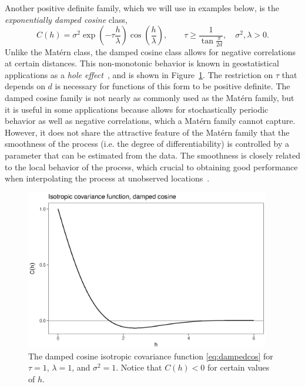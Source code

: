 \documentclass[12pt]{article}
\begin{document}
Another positive definite family, which we will use in examples below, is the \emph{exponentially damped cosine} class, 
\begin{equation} \label{eq:dampedcos}
  C(h) = \sigma^2 \exp \left( -\tau \frac{h}{\lambda} \right) \cos \left( \frac{h}{\lambda} \right), \qquad \tau \geq \frac{1}{\tan \frac{\pi}{2d}}, \quad \sigma^2,\lambda > 0.
\end{equation}
Unlike the Mat\'ern class, the damped cosine class allows for negative correlations at certain distances. This non-monotonic behavior is known in geostatistical applications as a \emph{hole effect}~\cite{Ye2015}, and is shown in Figure~\ref{fig:dampedcos_examples}. The restriction on $\tau$ that depends on $d$ is necessary for functions of this form to be positive definite. %
The damped cosine family is not nearly as commonly used as the Mat\'ern family, but it is useful in some applications because allows for stochastically periodic behavior as well as negative correlations, which a Mat\'ern family cannot capture. However, it does not share the attractive feature of the Mat\'ern family that the smoothness of the process (i.e. the degree of differentiability) is controlled by a parameter that can be estimated from the data. The smoothness is closely related to the local behavior of the process, which crucial to obtaining good performance when interpolating the process at unobserved locations~\cite{Stein1999}.

\begin{figure}[!htb]
  \centering
  \includegraphics[width=0.95\textwidth]{dampedcos_examples.eps}
  \caption{\small The damped cosine isotropic covariance function \eqref{eq:dampedcos} for $\tau = 1$, $\lambda = 1$, and $\sigma^2=1$. Notice that $C(h) < 0$ for certain values of $h$.}
  \label{fig:dampedcos_examples}
\end{figure}
\end{document}
